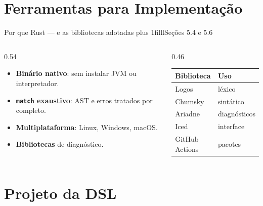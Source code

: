 \documentclass[aspectratio=169,12pt]{beamer}
\newcommand{\notexto}[1]{\hskip 0pt plus 1filll{\normalfont\small\color{white!85!acento}#1}}
\begin{document}
\section{Ferramentas para Implementação}

\begin{frame}{Por que Rust --- e as bibliotecas adotadas\notexto{Seções 5.4 e 5.6}}
  \begin{columns}[T]
    \begin{column}{0.54\textwidth}
      \begin{itemize}
        \item \textbf{Binário nativo}: sem instalar JVM ou interpretador.
        \item \textbf{\texttt{match} exaustivo}: AST e erros tratados por completo.
        \item \textbf{Multiplataforma}: Linux, Windows, macOS.
        \item \textbf{Bibliotecas} de diagnóstico.
      \end{itemize}
    \end{column}
    \begin{column}{0.46\textwidth}
      \centering
      \begin{tabular}{@{}ll@{}}
        \toprule
        \textbf{Biblioteca} & \textbf{Uso} \\
        \midrule
        Logos   & léxico \\
        Chumsky & sintático \\
        Ariadne & diagnósticos \\
        Iced    & interface \\
        \midrule
        GitHub Actions & pacotes \\
        \bottomrule
      \end{tabular}
    \end{column}
  \end{columns}
\end{frame}

\section{Projeto da DSL}
\end{document}
